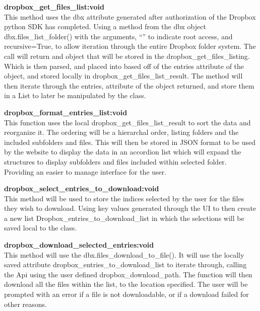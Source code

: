 \textbf{dropbox\_get\_files\_list:void} \\
    This method uses the dbx attribute generated after authorization of the Dropbox python SDK has completed. Using a method from the dbx object
    dbx.files\_list\_folder() with the arguments, ``'' to indicate root access, and recursive=True, to allow iteration through the entire Dropbox
    folder system. The call will return and object that will be stored in the dropbox\_get\_files\_listing. Which is then parsed, and placed into
    based off of the entries attribute of the object, and stored locally in dropbox\_get\_files\_list\_result. The method will then iterate through
    the entries, attribute of the object returned, and store them in a List to later be manipulated by the class.

\textbf{dropbox\_format\_entries\_list:void} \\
    This function uses the local dropbox\_get\_files\_list\_result to sort the data and reorganize it. The ordering will be a hierarchal order, listing 
    folders and the included subfolders and files. This will then be stored in JSON format to be used by the website to display the data in an
    accordion list which will expand the structures to display subfolders and files included within selected folder. Providing an easier to manage
    interface for the user.

\textbf{dropbox\_select\_entries\_to\_download:void} \\
    This method will be used to store the indices selected by the user for the files they wish to download. Using key values generated through 
    the UI to then create a new list Dropbox\_entries\_to\_download\_list in which the selections will be saved local to the class.

\textbf{dropbox\_download\_selected\_entries:void} \\
    This method will use the dbx.files\_download\_to\_file(). It will use the locally saved attribute dropbox\_entries\_to\_download\_list to
    iterate through, calling the Api using the user defined dropbox\_download\_path. The function will then download all the files within the 
    list, to the location specified. The user will be prompted with an error if a file is not downloadable, or if a download failed for other 
    reasons.

